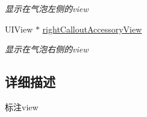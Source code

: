 \begin{DoxyCompactItemize}
\begin{DoxyCompactList}\small\item\em 显示在气泡左侧的view \end{DoxyCompactList}\item 
\hypertarget{interface_b_m_k_annotation_view_a65793288845c27e23233373b3e6b6216}{U\-I\-View $\ast$ \hyperlink{interface_b_m_k_annotation_view_a65793288845c27e23233373b3e6b6216}{right\-Callout\-Accessory\-View}}\label{interface_b_m_k_annotation_view_a65793288845c27e23233373b3e6b6216}

\begin{DoxyCompactList}\small\item\em 显示在气泡右侧的view \end{DoxyCompactList}\end{DoxyCompactItemize}


\subsection{详细描述}
标注view 

